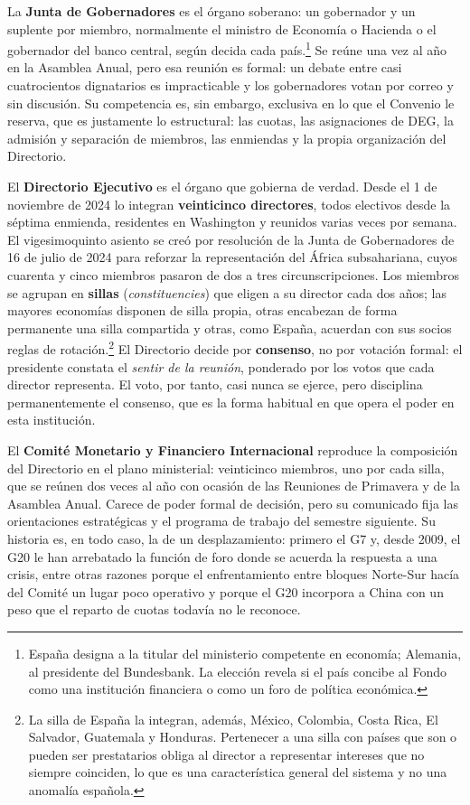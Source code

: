 \documentclass[10pt,a4paper]{article}
\begin{document}
La \textbf{Junta de Gobernadores} es el órgano soberano: un gobernador y un suplente por miembro, normalmente el ministro de Economía o Hacienda o el gobernador del banco central, según decida cada país.\footnote{%
    España designa a la titular del ministerio competente en economía; Alemania, al presidente del Bundesbank. La elección revela si el país concibe al Fondo como una institución financiera o como un foro de política económica.
} Se reúne una vez al año en la Asamblea Anual, pero esa reunión es formal: un debate entre casi cuatrocientos dignatarios es impracticable y los gobernadores votan por correo y sin discusión. Su competencia es, sin embargo, exclusiva en lo que el Convenio le reserva, que es justamente lo estructural: las cuotas, las asignaciones de DEG, la admisión y separación de miembros, las enmiendas y la propia organización del Directorio.

El \textbf{Directorio Ejecutivo} es el órgano que gobierna de verdad. Desde el 1 de noviembre de 2024 lo integran \textbf{veinticinco directores}, todos electivos desde la séptima enmienda, residentes en Washington y reunidos varias veces por semana. El vigesimoquinto asiento se creó por resolución de la Junta de Gobernadores de 16 de julio de 2024 para reforzar la representación del África subsahariana, cuyos cuarenta y cinco miembros pasaron de dos a tres circunscripciones. Los miembros se agrupan en \textbf{sillas} (\textit{constituencies}) que eligen a su director cada dos años; las mayores economías disponen de silla propia, otras encabezan de forma permanente una silla compartida y otras, como España, acuerdan con sus socios reglas de rotación.\footnote{%
    La silla de España la integran, además, México, Colombia, Costa Rica, El Salvador, Guatemala y Honduras. Pertenecer a una silla con países que son o pueden ser prestatarios obliga al director a representar intereses que no siempre coinciden, lo que es una característica general del sistema y no una anomalía española.
} El Directorio decide por \textbf{consenso}, no por votación formal: el presidente constata el \textit{sentir de la reunión}, ponderado por los votos que cada director representa. El voto, por tanto, casi nunca se ejerce, pero disciplina permanentemente el consenso, que es la forma habitual en que opera el poder en esta institución.

El \textbf{Comité Monetario y Financiero Internacional} reproduce la composición del Directorio en el plano ministerial: veinticinco miembros, uno por cada silla, que se reúnen dos veces al año con ocasión de las Reuniones de Primavera y de la Asamblea Anual. Carece de poder formal de decisión, pero su comunicado fija las orientaciones estratégicas y el programa de trabajo del semestre siguiente. Su historia es, en todo caso, la de un desplazamiento: primero el G7 y, desde 2009, el G20 le han arrebatado la función de foro donde se acuerda la respuesta a una crisis, entre otras razones porque el enfrentamiento entre bloques Norte-Sur hacía del Comité un lugar poco operativo y porque el G20 incorpora a China con un peso que el reparto de cuotas todavía no le reconoce.
\end{document}
